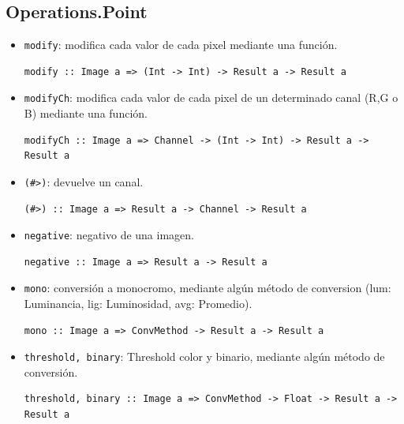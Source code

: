 \documentclass[a4paper, 11pt]{article} %
\begin{document}
\subsection*{Operations.Point}
	\begin{itemize} 
		\item \texttt{modify}: modifica cada valor de cada pixel mediante una función.
\begin{lstlisting} 
modify :: Image a => (Int -> Int) -> Result a -> Result a
\end{lstlisting}
		\item \texttt{modifyCh}: modifica cada valor de cada pixel de un determinado canal (R,G o B) mediante una función.
\begin{lstlisting} 
modifyCh :: Image a => Channel -> (Int -> Int) -> Result a -> Result a
\end{lstlisting}
		\item \texttt{(\#>)}: devuelve un canal.
\begin{lstlisting} 
(#>) :: Image a => Result a -> Channel -> Result a
\end{lstlisting}
		\item \texttt{negative}: negativo de una imagen.
\begin{lstlisting} 
negative :: Image a => Result a -> Result a
\end{lstlisting}
		\item \texttt{mono}: conversión a monocromo, mediante algún método de conversion (lum: Luminancia, lig: Luminosidad, avg: Promedio).
\begin{lstlisting} 
mono :: Image a => ConvMethod -> Result a -> Result a
\end{lstlisting}
		\item \texttt{threshold, binary}: Threshold color y binario, mediante algún método de conversión.
\begin{lstlisting} 
threshold, binary :: Image a => ConvMethod -> Float -> Result a -> Result a
\end{lstlisting}

	\end{itemize}	

\end{document}
